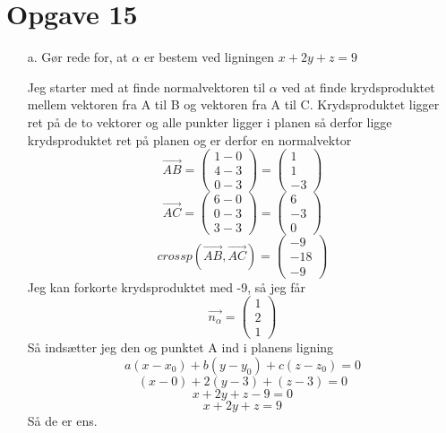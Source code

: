 \documentclass[12pt]{article}
\begin{document}
\section*{Opgave 15}

\begin{enumerate}

        \item[a.] Gør rede for, at $\alpha$ er bestem ved ligningen $x+2y+z=9$

                Jeg starter med at finde normalvektoren til $\alpha$ ved
                at finde krydsproduktet mellem vektoren fra A til B
                og vektoren fra A til C. Krydsproduktet ligger ret på de to vektorer
                og alle punkter ligger i planen så derfor ligge krydsproduktet ret
                på planen og er derfor en normalvektor
                $$\vec{AB} = \begin{pmatrix} 1-0 \\ 4-3 \\ 0-3 \end{pmatrix}
                        = \begin{pmatrix} 1 \\ 1 \\ -3 \end{pmatrix}$$
                $$\vec{AC} = \begin{pmatrix} 6-0 \\ 0-3 \\ 3-3 \end{pmatrix}
                        = \begin{pmatrix} 6 \\ -3 \\ 0 \end{pmatrix}$$
                $$crossp(\vec{AB}, \vec{AC}) = \begin{pmatrix} -9 \\ -18 \\ -9 \end{pmatrix}$$
                        Jeg kan forkorte krydsproduktet med -9, så jeg får
                $$\vec{n_{\alpha}} = \begin{pmatrix} 1 \\ 2 \\ 1 \end{pmatrix}$$
                Så indsætter jeg den og punktet A ind i planens ligning
                $$a(x-x_0)+b(y-y_0)+c(z-z_0)=0$$
                $$(x-0)+2(y-3)+(z-3) = 0$$
                $$x+2y+z-9=0$$
                $$x+2y+z=9$$
                Så de er ens.


\end{enumerate}
\end{document}

